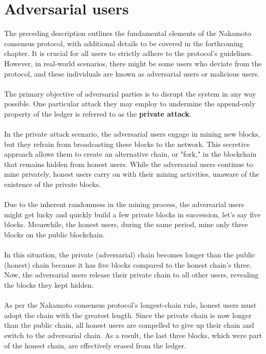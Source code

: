 \section{Adversarial users}
The preceding description outlines the fundamental elements of the Nakamoto consensus protocol, with additional details to be covered in the forthcoming chapter. It is crucial for all users to strictly adhere to the protocol's guidelines. However, in real-world scenarios, there might be some users who deviate from the protocol, and these individuals are known as adversarial users or malicious users.\\\\
The primary objective of adversarial parties is to disrupt the system in any way possible. One particular attack they may employ to undermine the append-only property of the ledger is referred to as the \textbf{private attack}.\\\\
In the private attack scenario, the adversarial users engage in mining new blocks, but they refrain from broadcasting these blocks to the network. This secretive approach allows them to create an alternative chain, or "fork," in the blockchain that remains hidden from honest users. While the adversarial users continue to mine privately, honest users carry on with their mining activities, unaware of the existence of the private blocks.\\\\
Due to the inherent randomness in the mining process, the adversarial users might get lucky and quickly build a few private blocks in succession, let's say five blocks. Meanwhile, the honest users, during the same period, mine only three blocks on the public blockchain.\\\\
In this situation, the private (adversarial) chain becomes longer than the public (honest) chain because it has five blocks compared to the honest chain's three. Now, the adversarial users release their private chain to all other users, revealing the blocks they kept hidden.\\\\
As per the Nakamoto consensus protocol's longest-chain rule, honest users must adopt the chain with the greatest length. Since the private chain is now longer than the public chain, all honest users are compelled to give up their chain and switch to the adversarial chain. As a result, the last three blocks, which were part of the honest chain, are effectively erased from the ledger.\\\\
